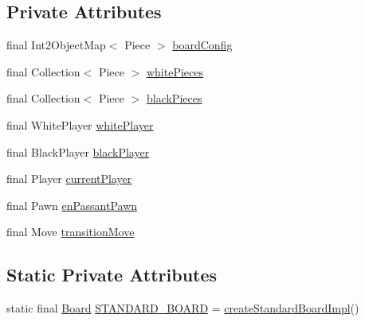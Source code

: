 \subsection*{Private Attributes}
\begin{DoxyCompactItemize}
\item 
final Int2\+Object\+Map$<$ Piece $>$ \mbox{\hyperlink{classcom_1_1chess_1_1engine_1_1classic_1_1board_1_1_board_a7764cf32d033006d2e090cdcd4229f7a}{board\+Config}}
\item 
final Collection$<$ Piece $>$ \mbox{\hyperlink{classcom_1_1chess_1_1engine_1_1classic_1_1board_1_1_board_a9e471b0856337f9cf136e2e4502002e9}{white\+Pieces}}
\item 
final Collection$<$ Piece $>$ \mbox{\hyperlink{classcom_1_1chess_1_1engine_1_1classic_1_1board_1_1_board_a0dbdad611d26703a6f8ca4103354e6c7}{black\+Pieces}}
\item 
final White\+Player \mbox{\hyperlink{classcom_1_1chess_1_1engine_1_1classic_1_1board_1_1_board_a090a5692a0d5454e69d2f3af5da5bbb1}{white\+Player}}
\item 
final Black\+Player \mbox{\hyperlink{classcom_1_1chess_1_1engine_1_1classic_1_1board_1_1_board_a7ee83bef4e70524b7d28214ee87d0acd}{black\+Player}}
\item 
final Player \mbox{\hyperlink{classcom_1_1chess_1_1engine_1_1classic_1_1board_1_1_board_a3a88b9c4c8f0e2d1d53e9a4a4cf7835e}{current\+Player}}
\item 
final Pawn \mbox{\hyperlink{classcom_1_1chess_1_1engine_1_1classic_1_1board_1_1_board_ac342c5db1ace79186d479aa996b4d994}{en\+Passant\+Pawn}}
\item 
final Move \mbox{\hyperlink{classcom_1_1chess_1_1engine_1_1classic_1_1board_1_1_board_aa795afed482f6af0c9a9e104649e0c80}{transition\+Move}}
\end{DoxyCompactItemize}
\subsection*{Static Private Attributes}
\begin{DoxyCompactItemize}
\item 
static final \mbox{\hyperlink{classcom_1_1chess_1_1engine_1_1classic_1_1board_1_1_board}{Board}} \mbox{\hyperlink{classcom_1_1chess_1_1engine_1_1classic_1_1board_1_1_board_a93bec1e14cdc0c5b152e54252e158019}{S\+T\+A\+N\+D\+A\+R\+D\+\_\+\+B\+O\+A\+RD}} = \mbox{\hyperlink{classcom_1_1chess_1_1engine_1_1classic_1_1board_1_1_board_a973e9a75cc7371052c75f01a025b2020}{create\+Standard\+Board\+Impl}}()
\end{DoxyCompactItemize}


